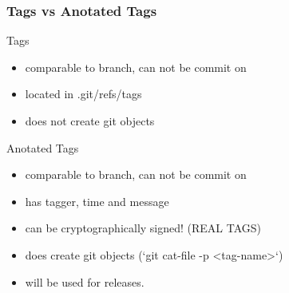 \begin{frame}
	\frametitle{Tags vs Anotated Tags}

	\begin{block}{Tags}
		\begin{itemize}
			\item comparable to branch, can not be commit on
			\item located in .git/refs/tags
			\item does not create git objects
		\end{itemize}
	\end{block}

	\begin{block}{Anotated Tags}
		\begin{itemize}
			\item comparable to branch, can not be commit on
			\item has tagger, time and message
			\item can be cryptographically signed! (REAL TAGS)
			\item does create git objects (`git cat-file -p <tag-name>`)
			\item will be used for releases.
		\end{itemize}
	\end{block}

\end{frame}
